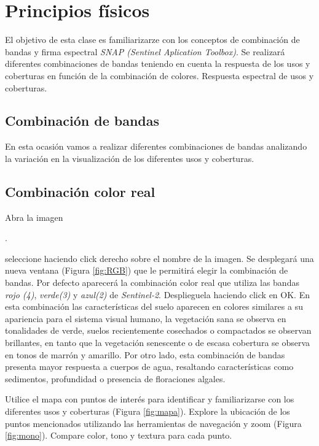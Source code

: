 \chapter{Principios físicos}

El objetivo de esta clase es familiarizarze con los conceptos de combinación de bandas y firma espectral \emph{SNAP (Sentinel Aplication Toolbox)}. Se realizará diferentes combinaciones de bandas teniendo en cuenta la respuesta de los usos y coberturas en función de la combinación de colores. Respuesta espectral de usos y coberturas.





\section{Combinación de bandas}
En esta ocasión vamos a realizar diferentes combinaciones de bandas analizando la variación en la visualización de los diferentes usos y coberturas. 


\section{Combinación color real}

Abra la imagen \begin{center} .
\end{center} seleccione  haciendo click derecho sobre el nombre de la imagen. Se desplegará una nueva ventana (Figura \ref{fig:RGB}) que le permitirá elegir la combinación de bandas. Por defecto aparecerá la combinación color real que utiliza las bandas \emph{rojo (4)}, \emph{verde(3)} y \emph{azul(2)} de \emph{Sentinel-2}. Desplieguela haciendo click en OK. En esta combinación las características del suelo aparecen en colores similares a su apariencia para el sistema visual humano, la vegetación sana se observa en tonalidades de verde, suelos recientemente cosechados o compactados se observan brillantes, en tanto que la vegetación senescente o de escasa cobertura se observa en tonos de marrón y amarillo. Por otro lado, esta combinación de bandas presenta mayor respuesta a cuerpos de agua, resaltando características como sedimentos, profundidad o presencia de floraciones algales. 

Utilice el mapa con puntos de interés para identificar y familiarizarse con los diferentes usos y coberturas (Figura \ref{fig:mapa}). Explore la ubicación de los puntos mencionados utilizando las herramientas de navegación y zoom  (Figura \ref{fig:mono}). Compare color, tono y textura para cada punto. 


